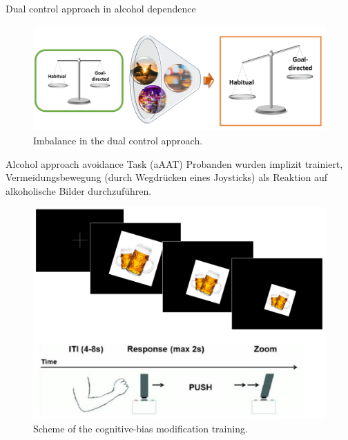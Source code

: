 \documentclass{bredelebeamer}
\begin{document}
\begin{frame}{Dual control approach in alcohol dependence}
    \begin{figure}
       
        \includegraphics[scale=0.41]{images/bZyklus.PNG}
         \caption{Imbalance in the dual control approach.}
    \end{figure}
\end{frame}


\begin{frame}{Alcohol approach avoidance Task (aAAT)}
Probanden wurden implizit trainiert, Vermeidungsbewegung (durch Wegdrücken eines Joysticks) als Reaktion auf alkoholische Bilder durchzuführen.
 				\begin{figure}
   				  \includegraphics[scale=0.3]{images/AAT_new.PNG}
   				\caption{\small{Scheme of the cognitive-bias modification training.}}
	\end{figure}
\end{frame}

\end{document}
